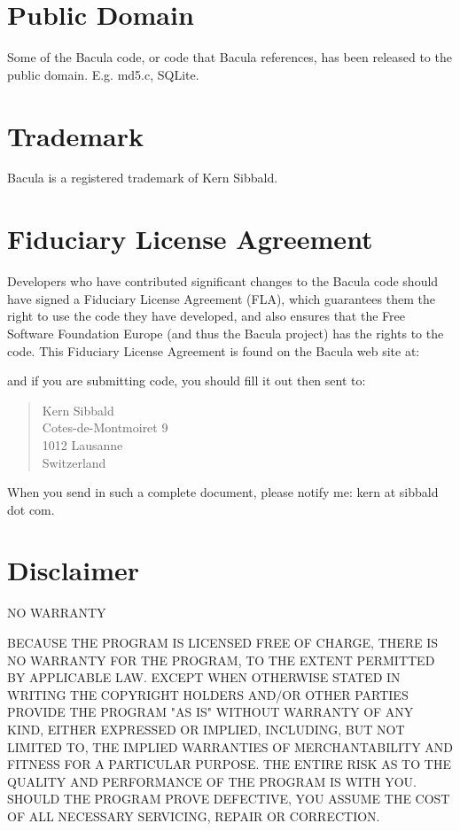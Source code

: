 \section{Public Domain}

Some of the Bacula code, or code that Bacula references, has been released
to the public domain.  E.g.  md5.c, SQLite.

\section{Trademark}

Bacula\raisebox{.6ex}{\textsuperscript{\textregistered}} is a registered
trademark of Kern Sibbald.

\section{Fiduciary License Agreement}
Developers who have contributed significant changes to the Bacula code
should have signed a Fiduciary License Agreement (FLA), which 
guarantees them the right to use the code they have developed, and also
ensures that the Free Software Foundation Europe (and thus the Bacula
project) has the rights to the code.  This Fiduciary License Agreement
is found on the Bacula web site at:


and if you are submitting code, you should fill it out then sent to:

\begin{quote}
     Kern Sibbald \\
     Cotes-de-Montmoiret 9 \\
     1012 Lausanne \\
     Switzerland \\
\end{quote}

When you send in such a
complete document, please notify me: kern at sibbald dot com.


\section{Disclaimer}

NO WARRANTY 

BECAUSE THE PROGRAM IS LICENSED FREE OF CHARGE, THERE IS NO WARRANTY FOR THE
PROGRAM, TO THE EXTENT PERMITTED BY APPLICABLE LAW. EXCEPT WHEN OTHERWISE
STATED IN WRITING THE COPYRIGHT HOLDERS AND/OR OTHER PARTIES PROVIDE THE
PROGRAM "AS IS" WITHOUT WARRANTY OF ANY KIND, EITHER EXPRESSED OR IMPLIED,
INCLUDING, BUT NOT LIMITED TO, THE IMPLIED WARRANTIES OF MERCHANTABILITY AND
FITNESS FOR A PARTICULAR PURPOSE. THE ENTIRE RISK AS TO THE QUALITY AND
PERFORMANCE OF THE PROGRAM IS WITH YOU. SHOULD THE PROGRAM PROVE DEFECTIVE,
YOU ASSUME THE COST OF ALL NECESSARY SERVICING, REPAIR OR CORRECTION. 

